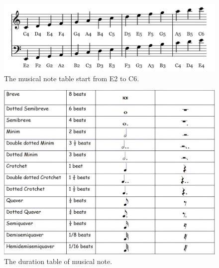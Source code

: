 \documentclass[11pt]{article}
\theoremstyle{definition}
\begin{document}
\begin{figure}
\centering
\includegraphics[scale=0.1]{pitchesonstaff.png} %
\caption{The musical note table start from E2 to C6.}
\label{fig:musical note} 
\end{figure}

\begin{figure}
\centering
\includegraphics[scale=0.1]{note_duration.png} %
\caption{The duration table of musical note.}
\label{fig:note duration} 
\end{figure}
\end{document}

